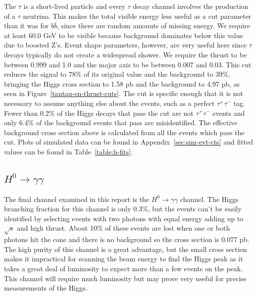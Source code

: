 \documentclass[a4paper]{article}
\begin{document}
The $\tau$ is a short-lived particle and every $\tau$ decay channel involves the production of a $\tau$ neutrino. This makes the total visible energy less useful as a cut parameter than it was for $b\bar{b}$, since there are random amounts of missing energy. We require at least 60.0 GeV to be visible because background dominates below this value due to boosted Z's. Event shape parameters, however, are very useful here since $\tau$ decays typically do not create a widespread shower. We require the thrust to be between 0.999 and 1.0 and the major axis to be between 0.007 and 0.03. This cut reduces the signal to 78\% of its original value and the background to 39\%, bringing the Higgs cross section to 1.58 pb and the background to 4.97 pb, as seen in Figure~\ref{tautau-en-thrust-cuts}. The cut is specific enough that it is not necessary to assume anything else about the events, such as a perfect $\tau^+\tau^-$ tag. Fewer than 0.2\% of the Higgs decays that pass the cut are not $\tau^+\tau^-$ events and only 6.4\% of the background events that pass are misidentified. The effective background cross section above is calculated from all the events which pass the cut. Plots of simulated data can be found in Appendix~\ref{sec:sim-evt-cts} and fitted values can be found in Table~\ref{table:h-fits}.

\subsection{$H^0\rightarrow \gamma\gamma$}
The final channel examined in this report is the $H^0\rightarrow \gamma\gamma$ channel. The Higgs branching fraction for this channel is only 0.3\%, but the events can't be easily identified by selecting events with two photons with equal energy adding up to $\sqrt{s}$ and high thrust. About 10\% of these events are lost when one or both photons hit the cone and there is no background so the cross section is 0.077 pb. The high purity of this channel is a great advantage, but the small cross section makes it impractical for scanning the beam energy to find the Higgs peak as it takes a great deal of luminosity to expect more than a few events on the peak. This channel will require much luminosity but may prove very useful for precise measurements of the Higgs.
\end{document}
